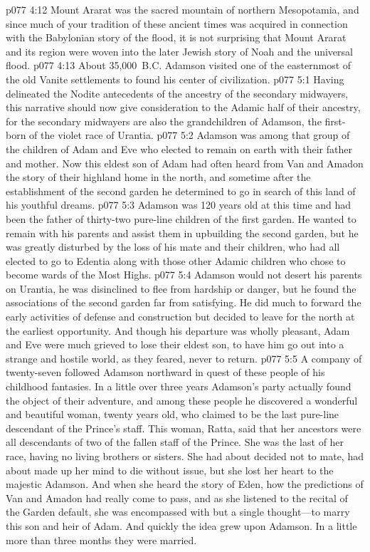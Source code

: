 \vs p077 4:12 Mount Ararat was the sacred mountain of northern Mesopotamia, and since much of your tradition of these ancient times was acquired in connection with the Babylonian story of the flood, it is not surprising that Mount Ararat and its region were woven into the later Jewish story of Noah and the universal flood.
\vs p077 4:13 About 35,000~B.C. Adamson visited one of the easternmost of the old Vanite settlements to found his center of civilization.
\vs p077 5:1 Having delineated the Nodite antecedents of the ancestry of the secondary midwayers, this narrative should now give consideration to the Adamic half of their ancestry, for the secondary midwayers are also the grandchildren of Adamson, the first\hyp{}born of the violet race of Urantia.
\pc \vs p077 5:2 Adamson was among that group of the children of Adam and Eve who elected to remain on earth with their father and mother. Now this eldest son of Adam had often heard from Van and Amadon the story of their highland home in the north, and sometime after the establishment of the second garden he determined to go in search of this land of his youthful dreams.
\vs p077 5:3 Adamson was 120 years old at this time and had been the father of thirty\hyp{}two pure\hyp{}line children of the first garden. He wanted to remain with his parents and assist them in upbuilding the second garden, but he was greatly disturbed by the loss of his mate and their children, who had all elected to go to Edentia along with those other Adamic children who chose to become wards of the Most Highs.
\vs p077 5:4 Adamson would not desert his parents on Urantia, he was disinclined to flee from hardship or danger, but he found the associations of the second garden far from satisfying. He did much to forward the early activities of defense and construction but decided to leave for the north at the earliest opportunity. And though his departure was wholly pleasant, Adam and Eve were much grieved to lose their eldest son, to have him go out into a strange and hostile world, as they feared, never to return.
\vs p077 5:5 A company of twenty\hyp{}seven followed Adamson northward in quest of these people of his childhood fantasies. In a little over three years Adamson’s party actually found the object of their adventure, and among these people he discovered a wonderful and beautiful woman, twenty years old, who claimed to be the last pure\hyp{}line descendant of the Prince’s staff. This woman, Ratta, said that her ancestors were all descendants of two of the fallen staff of the Prince. She was the last of her race, having no living brothers or sisters. She had about decided not to mate, had about made up her mind to die without issue, but she lost her heart to the majestic Adamson. And when she heard the story of Eden, how the predictions of Van and Amadon had really come to pass, and as she listened to the recital of the Garden default, she was encompassed with but a single thought---to marry this son and heir of Adam. And quickly the idea grew upon Adamson. In a little more than three months they were married.
